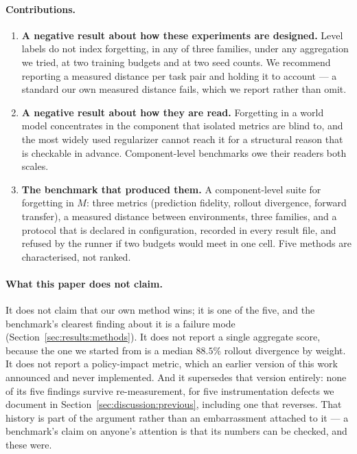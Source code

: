 \paragraph{Contributions.}
\begin{enumerate}
  \item \textbf{A negative result about how these experiments are designed.}
  Level labels do not index forgetting, in any of three families, under any
  aggregation we tried, at two training budgets and at two seed counts. We recommend reporting a
  measured distance per task pair and holding it to account --- a standard our
  own measured distance fails, which we report rather than omit.
  \item \textbf{A negative result about how they are read.} Forgetting in a
  world model concentrates in the component that isolated metrics are blind to,
  and the most widely used regularizer cannot reach it for a structural reason
  that is checkable in advance. Component-level benchmarks owe their readers
  both scales.
  \item \textbf{The benchmark that produced them.} A component-level suite for
  forgetting in $M$: three metrics (prediction fidelity, rollout divergence,
  forward transfer), a measured distance between environments, three families,
  and a protocol that is declared in configuration, recorded in every result
  file, and refused by the runner if two budgets would meet in one cell. Five
  methods are characterised, not ranked.
\end{enumerate}

\paragraph{What this paper does not claim.} It does not claim that our own
method wins; it is one of the five, and the benchmark's clearest finding about
it is a failure mode (Section~\ref{sec:results:methods}). It does not report a
single aggregate score, because the one we started from is a median $88.5\%$
rollout divergence by weight. It does not report a policy-impact metric, which an
earlier version of this work announced and never implemented. And it supersedes
that version entirely: none of its five findings survive re-measurement, for
five instrumentation defects we document in Section~\ref{sec:discussion:previous},
including one that reverses. That history is part of the argument rather than
an embarrassment attached to it --- a benchmark's claim on anyone's attention is
that its numbers can be checked, and these were.
